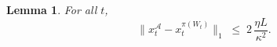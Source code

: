 \documentclass[11pt]{article}
\newtheorem{Thm:Lemma}{Lemma}
\begin{document}



\begin{Thm:Lemma}
\label{lem:x-gap-bound}
For all \(t\),
\[
\|x_t^{\mathcal{A}} - x_t^{\pi(W_t)}\|_1
\;\le\;
2\,\frac{\eta L}{\kappa^2}.
\]
\end{Thm:Lemma}
\end{document}
